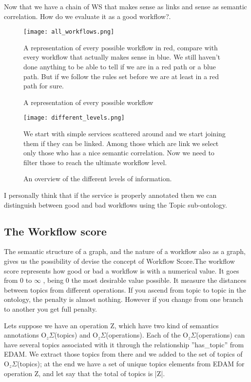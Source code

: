 \documentclass[a4paper,10pt]{article}
\begin{document}
  Now that we have a chain of WS that makes sense as links and sense as semantic correlation. How do we evaluate it as a good workflow?.

  \begin{figure}[H]
  {\centering
  \texttt{[image: all\_workflows.png]}
  \caption{A representation of every possible workflow} \label{fig:DifferentWorkflows}}
  \medskip
  \small
  A representation of every possible workflow in red, compare with every workflow that actually makes sense in blue. We still haven't done anything to be able to tell if we are in a red path or a blue path. But if we follow the rules set before we are at least in a red path for sure.
  \end{figure}

  \begin{figure}[H]
  {\centering
  \texttt{[image: different\_levels.png]}
  \caption{An overview of the different levels of information.} \label{fig:DifferentLevels}}
  \medskip
  \small
  We start with simple services scattered around and we start joining them if they can be linked. Among those which are link we select only those who has a nice semantic correlation. Now we need to filter those to reach the ultimate workflow level.
  \end{figure}
  
  I personally think that if the service is properly annotated then we can distinguish between good and bad workflows using the Topic sub-ontology.

  \subsection{The Workflow score}
  \label{sec:WorkflowScore}

  The semantic structure of a graph, and the nature of a workflow also as a graph, gives us the possibility of devise the concept of Workflow Score.The workflow score represents how good or bad a workflow is with a numerical value. It goes from 0 to $\infty$ , being 0 the most desirable value possible. It measure the distances between topics from different operations. If you ascend from topic to topic in the ontology, the penalty is almost nothing. However if you change from one branch to another you get full penalty.\vspace{3 mm}

  Lets suppose we have an operation Z, which have two kind of semantics annotations O$_{z}\Sigma$(topics) and O$_{z}\Sigma$(operations). Each of the O$_{z}\Sigma$(operations) can have several topics associated with it through the relationship ''has\_topic'' from EDAM. We extract those topics from there and we added to the set of topics of O$_{z}\Sigma$(topics); at the end we have a set of unique topics elements from EDAM for operation Z, and let say that the total of topics is |Z|.\vspace{3 mm}
\end{document}

